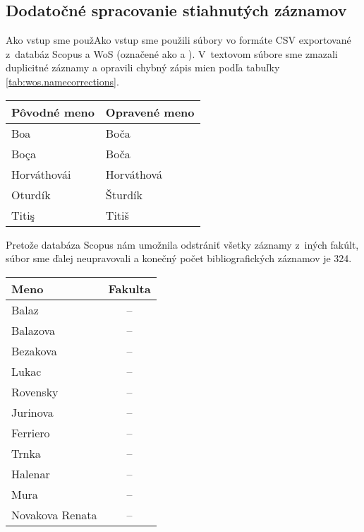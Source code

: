 \subsection{Dodatočné spracovanie stiahnutých záznamov}

Ako vstup sme použAko vstup sme použili súbory vo formáte CSV exportované
z~databáz Scopus a WoS (označené ako  a
).  V~textovom súbore
 sme zmazali duplicitné záznamy a opravili
chybný zápis mien podľa tabuľky \ref{tab:wos.namecorrections}.

\begin{SCtable}
\caption{Oprava chýb v~menách autorov v~súbore .}
\label{tab:wos.namecorrections}
\centering\small
\begin{tabular}{ll}
  \hline\noalign{\vspace{.3ex}}
  Pôvodné meno & Opravené meno \\[0.3ex]
  \hline\noalign{\vspace{.5ex}}
  Boa          & Boča       \\
  Boça         & Boča       \\
  Horváthovái  & Horváthová \\
  Oturdík      & Šturdík    \\
  Titiş        & Titiš      \\[0.5ex]
  \hline
\end{tabular}
\end{SCtable}

Pretože databáza Scopus nám umožnila odstrániť všetky záznamy z~iných fakúlt,
súbor  sme ďalej neupravovali a konečný počet
bibliografických záznamov je 324.

\begin{SCtable}
\caption{Mená pracovníkov, ktorí nepatria do Fakulty prírodných vied.}
\label{tab:wos.excludedstaff}
\centering\small
\begin{tabular}{lc}
  \hline\noalign{\vspace{.3ex}}
  Meno            & Fakulta \\[0.3ex]
  \hline\noalign{\vspace{.5ex}}
  Balaz           & -- \\
  Balazova        & -- \\
  Bezakova        & -- \\
  Lukac           & -- \\
  Rovensky        & -- \\[1ex]
  Jurinova        & -- \\
  Ferriero        & -- \\
  Trnka           & -- \\
  Halenar         & -- \\
  Mura            & -- \\[1ex]
  Novakova Renata & -- \\[0.5ex]
  \hline
\end{tabular}
\end{SCtable}

